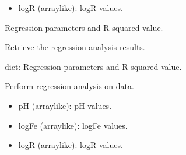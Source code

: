 \documentclass[a4paper,10pt,english]{sphinxmanual}
\begin{document}
\begin{fulllineitems}
\begin{fulllineitems}
\begin{description}
\begin{itemize}
\item {} 
\sphinxAtStartPar
logR (array\sphinxhyphen{}like): logR values.

\end{itemize}

\sphinxAtStartPar
Regression parameters and R squared value.

\end{description}

\end{fulllineitems}


\begin{fulllineitems}
\label{\detokenize{utils:src.utils.plane3D_plot.Plane3DPlotter.get_results}}
\pysigstartsignatures
{}
\pysigstopsignatures
\sphinxAtStartPar
Retrieve the regression analysis results.
\begin{description}
\sphinxAtStartPar
dict: Regression parameters and R squared value.

\end{description}

\end{fulllineitems}


\begin{fulllineitems}
\label{\detokenize{utils:src.utils.plane3D_plot.Plane3DPlotter.perform_analysis}}
\pysigstartsignatures
{}
\pysigstopsignatures
\sphinxAtStartPar
Perform regression analysis on data.
\begin{description}
\begin{itemize}
\item {} 
\sphinxAtStartPar
pH (array\sphinxhyphen{}like): pH values.

\item {} 
\sphinxAtStartPar
logFe (array\sphinxhyphen{}like): logFe values.

\item {} 
\sphinxAtStartPar
logR (array\sphinxhyphen{}like): logR values.


\end{itemize}
\end{description}
\end{fulllineitems}
\end{fulllineitems}
\end{document}
